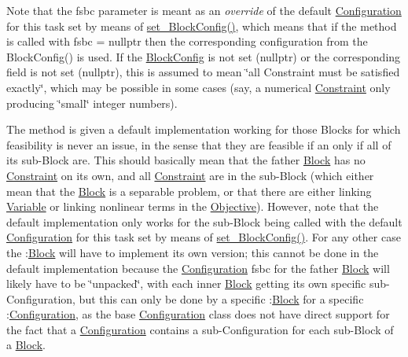 Note that the fsbc parameter is meant as an {\itshape override} of the default \mbox{\hyperlink{class_s_m_spp__di__unipi__it_1_1_configuration}{Configuration}} for this task set by means of \mbox{\hyperlink{class_s_m_spp__di__unipi__it_1_1_block_a18d411b740a47db00d15083c5c7ef2ba}{set\+\_\+\+Block\+Config()}}, which means that if the method is called with fsbc = nullptr then the corresponding configuration from the Block\+Config() is used. If the \mbox{\hyperlink{class_s_m_spp__di__unipi__it_1_1_block_config}{Block\+Config}} is not set (nullptr) or the corresponding field is not set (nullptr), this is assumed to mean \char`\"{}all Constraint must be satisfied
exactly\char`\"{}, which may be possible in some cases (say, a numerical \mbox{\hyperlink{class_s_m_spp__di__unipi__it_1_1_constraint}{Constraint}} only producing \char`\"{}small\char`\"{} integer numbers).

The method is given a default implementation working for those Blocks for which feasibility is never an issue, in the sense that they are feasible if an only if all of its sub-\/\+Block are. This should basically mean that the father \mbox{\hyperlink{class_s_m_spp__di__unipi__it_1_1_block}{Block}} has no \mbox{\hyperlink{class_s_m_spp__di__unipi__it_1_1_constraint}{Constraint}} on its own, and all \mbox{\hyperlink{class_s_m_spp__di__unipi__it_1_1_constraint}{Constraint}} are in the sub-\/\+Block (which either mean that the \mbox{\hyperlink{class_s_m_spp__di__unipi__it_1_1_block}{Block}} is a separable problem, or that there are either linking \mbox{\hyperlink{class_s_m_spp__di__unipi__it_1_1_variable}{Variable}} or linking nonlinear terms in the \mbox{\hyperlink{class_s_m_spp__di__unipi__it_1_1_objective}{Objective}}). However, note that the default implementation only works for the sub-\/\+Block being called with the default \mbox{\hyperlink{class_s_m_spp__di__unipi__it_1_1_configuration}{Configuration}} for this task set by means of \mbox{\hyperlink{class_s_m_spp__di__unipi__it_1_1_block_a18d411b740a47db00d15083c5c7ef2ba}{set\+\_\+\+Block\+Config()}}. For any other case the \+:\mbox{\hyperlink{class_s_m_spp__di__unipi__it_1_1_block}{Block}} will have to implement its own version; this cannot be done in the default implementation because the \mbox{\hyperlink{class_s_m_spp__di__unipi__it_1_1_configuration}{Configuration}} fsbc for the father \mbox{\hyperlink{class_s_m_spp__di__unipi__it_1_1_block}{Block}} will likely have to be \char`\"{}unpacked\char`\"{}, with each inner \mbox{\hyperlink{class_s_m_spp__di__unipi__it_1_1_block}{Block}} getting its own specific sub-\/\+Configuration, but this can only be done by a specific \+:\mbox{\hyperlink{class_s_m_spp__di__unipi__it_1_1_block}{Block}} for a specific \+:\mbox{\hyperlink{class_s_m_spp__di__unipi__it_1_1_configuration}{Configuration}}, as the base \mbox{\hyperlink{class_s_m_spp__di__unipi__it_1_1_configuration}{Configuration}} class does not have direct support for the fact that a \mbox{\hyperlink{class_s_m_spp__di__unipi__it_1_1_configuration}{Configuration}} contains a sub-\/\+Configuration for each sub-\/\+Block of a \mbox{\hyperlink{class_s_m_spp__di__unipi__it_1_1_block}{Block}}. 

